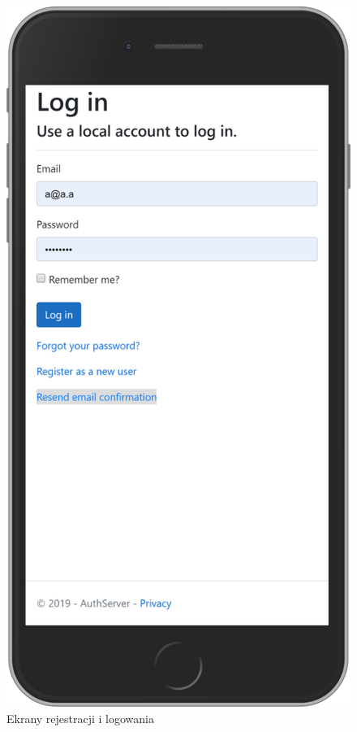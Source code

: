 \begin{figure}[H]
\begin{minipage}{.5\textwidth}
		\end{minipage}%
		\begin{minipage}{0.5\textwidth}
			\includegraphics[width=0.9\linewidth]{rys06/login.png}
		\end{minipage}
		\caption{Ekrany rejestracji i logowania}
		\label{fig:login}
	\end{figure}

